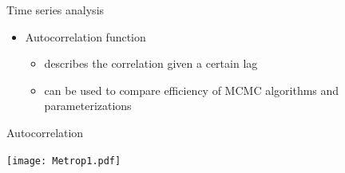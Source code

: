 \documentclass[finnish,english,t]{beamer}
\begin{document}


    


\begin{frame}{Time series analysis}

  \begin{itemize}
  \item Autocorrelation function
    \begin{itemize}
    \item describes the correlation given a certain lag
    \item can be used to compare efficiency of MCMC algorithms and parameterizations
    \end{itemize}
  \end{itemize}
\end{frame}

\begin{frame}{Autocorrelation}

  \vspace{-1.2\baselineskip}
  \hspace{-5mm}\begin{minipage}[t][][b]{4.5cm}
    \texttt{[image: Metrop1.pdf]}
  \end{minipage}
  \begin{minipage}[t][][b]{5cm}
  \end{minipage}
  \vspace{-\baselineskip}

\end{frame}
\end{document}
